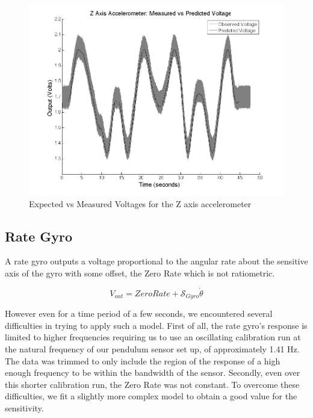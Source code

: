 \documentclass{article}
\theoremstyle{plain}
\theoremstyle{definition}
\theoremstyle{remark}
\newcommand{\Sens}{\mathcal{S}}
\begin{document}
\begin{figure}
\begin{center}
\includegraphics[width = 13cm]{ZaxisAccel_Calib.png}
\caption{Expected vs Measured Voltages for the Z axis accelerometer}
\label{ZaccelCalib}
\end{center}
\end{figure}

\subsection*{Rate Gyro}


A rate gyro outputs a voltage proportional to the angular rate about the sensitive axis of the gyro with some offset, the Zero Rate which is not ratiometric.  

$$V_{out} = ZeroRate + \Sens_{Gyro} \dot{\theta} $$

However even for a time period of a few seconds, we encountered several difficulties in trying to apply such a model.  First of all, the rate gyro's response is limited to higher frequencies requiring us to use an oscillating calibration run at the natural frequency of our pendulum sensor set up, of approximately 1.41 Hz.  The data was trimmed to only include the region of the response of a high enough frequency to be within the bandwidth of the sensor.  Secondly, even over this shorter calibration run, the Zero Rate was not constant.  To overcome these difficulties, we fit a slightly more complex model to obtain a good value for the sensitivity.
\end{document}
